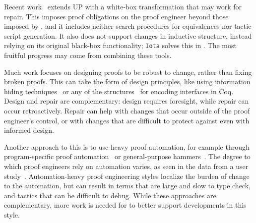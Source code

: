 Recent work~\cite{tabareau2019marriage} extends UP with 
a white-box transformation that may work for repair.
This imposes proof obligations on the proof engineer beyond those imposed by \toolname,
and it includes neither search procedures for equivalences nor tactic script generation.
It also does not support changes in inductive structure,
instead relying on its original black-box functionality;
\lstinline{Iota} solves this in \toolname. %
The most fruitful progress may come from combining these tools. %


Much work focuses on designing proofs
to be robust to change, rather than fixing broken proofs.
This can take the form of design principles, like using 
information hiding techniques~\cite{Woos:2016:PCF:2854065.2854081, Klein:2014:CFV:2584468.2560537}
or any of the structures~\cite{Chrzaszcz2003, Sozeau2008, Saibi:PhD} for encoding interfaces in Coq.
Design and repair are complementary: design requires foresight, while repair can occur retroactively.
Repair can help with changes that occur outside of the proof engineer's control,
or with changes that are difficult to protect against even with informed design.

Another approach to this is to use heavy proof automation, for example through
program-specific proof automation~\cite{Chlipala:2013:CPD:2584504}
or general-purpose hammers~\cite{Blanchette2016b, Blanchette2013, Kaliszyk2014, Czajka2018}.
The degree to which proof engineers rely on automation varies, as seen in the data from a user study~\cite{replica}.
Automation-heavy proof engineering styles localize the burden of change to the automation,
but can result in terms that are large and slow to type check,
and tactics that can be difficult to debug.
While these approaches are complementary, more work is needed for \toolname to better support 
developments in this style.



